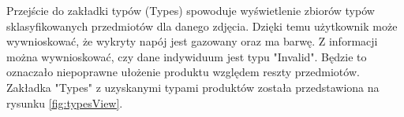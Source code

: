 {\begin{figure}[h]
\end{figure}

Przejście do zakładki typów (Types) spowoduje wyświetlenie zbiorów typów sklasyfikowanych przedmiotów dla danego zdjęcia. Dzięki temu użytkownik może wywnioskować, że wykryty napój jest gazowany oraz ma barwę. Z informacji można wywnioskować, czy dane indywiduum jest typu "Invalid". Będzie to oznaczało niepoprawne ułożenie produktu względem reszty przedmiotów. Zakładka "Types" z uzyskanymi typami produktów została przedstawiona na rysunku \ref{fig:typesView}.

\begin{figure}[h]
	\centering
	\quad

\end{figure}}
